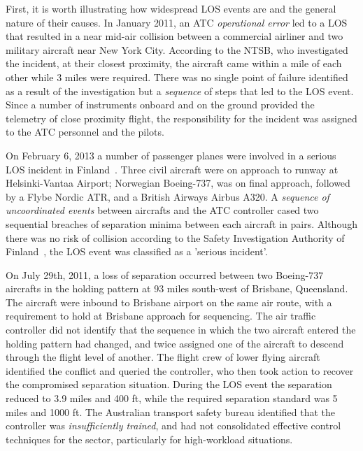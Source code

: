 \documentclass[letter,onecolumn,12pt]{aiaa-tc}
\newcommand{\1}{1_n}
\begin{document}
First, it is worth illustrating how widespread LOS events are and the general nature of their causes. In January 2011, an ATC \emph{operational error} led to a LOS that resulted in a near mid-air collision  between a commercial airliner and two military aircraft near New York City. According to the NTSB\cite{OIG_AR2013}, who investigated the incident, at their closest proximity, the aircraft came within a mile of each other while 3 miles were required. There was no single point of failure identified as a result of the investigation but a \emph{sequence} of steps that led to the LOS event. Since a number of instruments onboard and on the ground provided the telemetry of close proximity flight, the responsibility for the incident was assigned to the ATC personnel and the pilots.

On February 6, 2013  a number of  passenger planes were involved in a serious LOS incident in Finland~\cite{Vantaa_IR2013}.  Three civil aircraft were on approach to runway at Helsinki-Vantaa Airport; Norwegian Boeing-737, was on final approach, followed by a Flybe Nordic ATR, and a British Airways Airbus A320. A \emph{sequence of uncoordinated events} between aircrafts and the ATC controller cased two sequential breaches of separation minima between each aircraft in pairs. Although there was no risk of collision according to the Safety Investigation Authority of Finland~\cite{Vantaa_IR2013}, the LOS event was classified as a 'serious incident'.

On July 29th, 2011, a loss of separation occurred between two Boeing-737 aircrafts in the holding pattern at 93 miles south-west of Brisbane, Queensland\cite{Brisbane_ATSR2011}. The aircraft were inbound to Brisbane airport on the same air route, with a requirement to hold at Brisbane approach for sequencing. The air traffic controller did not identify that the sequence in which the two aircraft entered the holding pattern had changed, and twice assigned one of the aircraft to descend through the flight level of another. The flight crew of lower flying aircraft identified the conflict and queried the controller, who then took action to recover the compromised separation situation. During the LOS event the separation reduced to 3.9 miles and 400 ft, while the required separation standard was 5 miles and 1000 ft. The Australian transport safety bureau identified that the controller was \emph{insufficiently trained}, and had not consolidated effective control techniques for the sector, particularly for high-workload situations.
\end{document}
